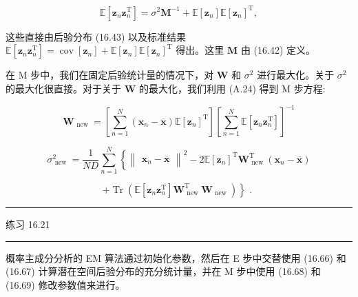 \documentclass[10pt]{report}
\newcommand{\HRule}{\begin{center}\rule{0.9\linewidth}{0.2mm}\end{center}}
\begin{document}
\[
\mathbb{E}\left\lbrack  {{\mathbf{z}}_{n}{\mathbf{z}}_{n}^{\mathrm{T}}}\right\rbrack   = {\sigma }^{2}{\mathbf{M}}^{-1} + \mathbb{E}\left\lbrack  {\mathbf{z}}_{n}\right\rbrack  \mathbb{E}{\left\lbrack  {\mathbf{z}}_{n}\right\rbrack  }^{\mathrm{T}}, \tag{16.67}
\]

这些直接由后验分布 (16.43) 以及标准结果 \(\mathbb{E}\left\lbrack  {{\mathbf{z}}_{n}{\mathbf{z}}_{n}^{\mathrm{T}}}\right\rbrack   = \operatorname{cov}\left\lbrack  {\mathbf{z}}_{n}\right\rbrack   + \mathbb{E}\left\lbrack  {\mathbf{z}}_{n}\right\rbrack  \mathbb{E}{\left\lbrack  {\mathbf{z}}_{n}\right\rbrack  }^{\mathrm{T}}\) 得出。这里 \(\mathbf{M}\) 由 (16.42) 定义。

在 M 步中，我们在固定后验统计量的情况下，对 \(\mathbf{W}\) 和 \({\sigma }^{2}\) 进行最大化。关于 \({\sigma }^{2}\) 的最大化很直接。对于关于 \(\mathbf{W}\) 的最大化，我们利用 (A.24) 得到 M 步方程:

\[
{\mathbf{W}}_{\text{ new }} = \left\lbrack  {\mathop{\sum }\limits_{{n = 1}}^{N}\left( {{\mathbf{x}}_{n} - \overline{\mathbf{x}}}\right) \mathbb{E}{\left\lbrack  {\mathbf{z}}_{n}\right\rbrack  }^{\mathrm{T}}}\right\rbrack  {\left\lbrack  \mathop{\sum }\limits_{{n = 1}}^{N}\mathbb{E}\left\lbrack  {\mathbf{z}}_{n}{\mathbf{z}}_{n}^{\mathrm{T}}\right\rbrack  \right\rbrack  }^{-1} \tag{16.68}
\]

\[
{\sigma }_{\text{ new }}^{2} = \frac{1}{ND}\mathop{\sum }\limits_{{n = 1}}^{N}\left\{  {{\begin{Vmatrix}{\mathbf{x}}_{n} - \overline{\mathbf{x}}\end{Vmatrix}}^{2} - 2\mathbb{E}{\left\lbrack  {\mathbf{z}}_{n}\right\rbrack  }^{\mathrm{T}}{\mathbf{W}}_{\text{ new }}^{\mathrm{T}}\left( {{\mathbf{x}}_{n} - \overline{\mathbf{x}}}\right) }\right.
\]

\[
\left. {+\operatorname{Tr}\left( {\mathbb{E}\left\lbrack  {{\mathbf{z}}_{n}{\mathbf{z}}_{n}^{\mathrm{T}}}\right\rbrack  {\mathbf{W}}_{\text{ new }}^{\mathrm{T}}{\mathbf{W}}_{\text{ new }}}\right) }\right\}  \text{ . } \tag{16.69}
\]

\HRule

练习 16.21

\HRule

概率主成分分析的 EM 算法通过初始化参数，然后在 E 步中交替使用 (16.66) 和 (16.67) 计算潜在空间后验分布的充分统计量，并在 M 步中使用 (16.68) 和 (16.69) 修改参数值来进行。
\end{document}
